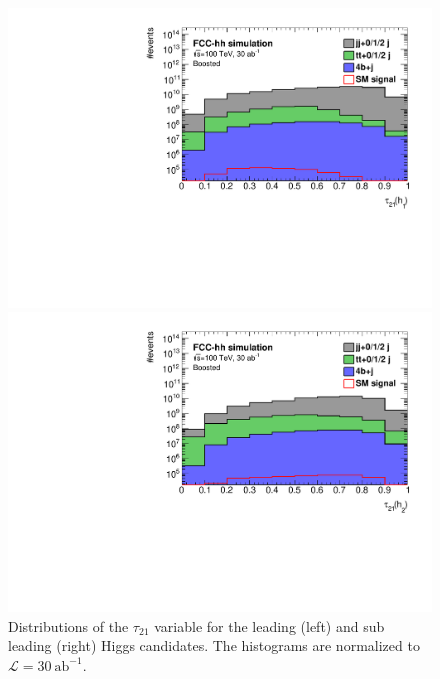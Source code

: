 \begin{figure}
	\centering
	\begin{minipage}{.5\textwidth}
		\centering
		\includegraphics[trim={.65cm 0 0 0},clip,width=\linewidth]{./Figures/hist_h1_tau21_stack.pdf}
	\end{minipage}%
	\begin{minipage}{.5\textwidth}
		\centering
		\includegraphics[trim={0 0 .65cm 0},clip,width=\linewidth]{./Figures/hist_h2_tau21_stack.pdf}
	\end{minipage}
	\label{fig:sub_stack}
	\caption{Distributions of the $\tau_{21}$ variable for the leading (left) and sub leading (right) Higgs candidates. The histograms are normalized to $\mathcal{L}=30~\text{ab}^{-1}$.}
\end{figure} 

